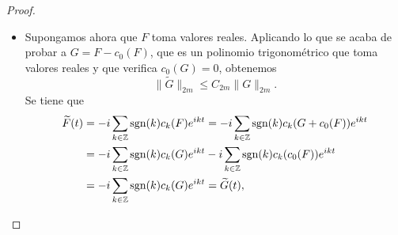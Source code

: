 \documentclass[a4paper, 12pt, oneside]{book}
\begin{document}
\begin{proof}
\begin{itemize}
\begin{align*}
            \|F^{2k}\widetilde{F}^{2m-2k}\|_1 &\leq \|F^{2k}\|_{\frac{2m}{2k}}\|\widetilde{F}^{2m-2k}\|_{\frac{2m}{2m-2k}} \\
            &=\Bigl( \frac{1}{2\pi}\integral{-\pi}{\pi}{F(t)^{2k\frac{2m}{2k}}}\Bigr)^{\frac{2k}{2m}}\Bigl( \frac{1}{2\pi}\integral{-\pi}{\pi}{\widetilde{F}(t)^{{2m-2k}\frac{2m}{2m-2k}}}\Bigr)^{\frac{2m-2k}{2m}} \\
            &= \|F\|_{2m}^{2k}\|\widetilde{F}\|_{2m}^{2m-2k}.
        \end{align*}
        Si $k = m$, sigue siendo cierta la desigualdad $\|F^{2k}\widetilde{F}^{2m-2k}\|_1 \leq \|F\|_{2m}^{2k}\|\widetilde{F}\|_{2m}^{2m-2k}$.  Tenemos entonces
        \[\|\widetilde{F}\|_{2m}^{2m} \leq \sum_{k=1}^m \binom{2m}{2k}\|F\|_{2m}^{2k}\|\widetilde{F}\|_{2m}^{2m-2k}.\]
        Dividiendo por $\|\widetilde{F}\|_{2m}^{2m}$ (si fuese $\widetilde{F} = 0$ no hay nada que probar),
        \[1 \leq \sum_{k=1}^m \binom{2m}{2k}\Bigl(\frac{\|F\|_{2m}}{\|\widetilde{F}\|_{2m}}\Bigr)^{2k}.\]
        Sea $R = \frac{\|F\|_{2m}}{\|\widetilde{F}\|_{2m}}$ y consideremos la función $\varphi \colon [0,\infty)\to\R$ dada por
        \[\varphi(t) = \sum_{k=1}^m \binom{2m}{2k}t^{2k}.\]
        La última desigualdad nos dice que $\varphi(R) \geq 1$. También tenemos que $\varphi$ es continua, estrictamente creciente y tal que
        \[\lim_{t \to \infty} \varphi(t) = \infty, \qquad \varphi(0) = 0.\]
        Por el teorema de los valores intermedios, existe $C > 0$ (que solo depende de $m$) tal que $\varphi(C) = 1$. Como $\varphi(R) \geq 1$ y $\varphi$ es estrictamente creciente, tiene que ser $R \geq C$, luego
        \[\|F\|_{2m} \geq C\|\widetilde{F}\|_{2m}.\]
        Llamando $C_{2m} = \frac{1}{C}$, obtenemos que
        \[\|\widetilde{F}\|_{2m} \leq C_{2m}\|F\|_{2m}.\]
        \item Supongamos ahora que $F$ toma valores reales. Aplicando lo que se acaba de probar a $G = F-c_0(F)$, que es un polinomio trigonométrico que toma valores reales y que verifica $c_0(G)=0$, obtenemos
        \[\|\widetilde{G}\|_{2m}\leq C_{2m}\|G\|_{2m}.\]
        Se tiene que
        \begin{align*}
            \widetilde{F}(t) &= -i\sum_{k\in\mathbb Z}\textup{sgn}(k)c_k(F)e^{ikt} = -i\sum_{k\in\mathbb Z}\textup{sgn}(k)c_k(G+c_0(F))e^{ikt} \\
            &= -i\sum_{k\in\mathbb Z}\textup{sgn}(k)c_k(G)e^{ikt}-i\sum_{k\in\mathbb Z}\textup{sgn}(k)c_k(c_0(F))e^{ikt} \\
            &= -i\sum_{k\in\mathbb Z}\textup{sgn}(k)c_k(G)e^{ikt} = \widetilde{G}(t),
        \end{align*}

\end{itemize}
\end{proof}
\end{document}
